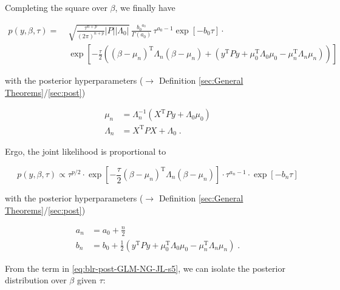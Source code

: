 \documentclass[a4paper,12pt,twoside]{book}
\begin{document}
Completing the square over $\beta$, we finally have

\begin{equation} \label{eq:blr-post-GLM-NG-JL-s4}
\begin{split}
p(y,\beta,\tau) = \; & \sqrt{\frac{\tau^{n+p}}{(2 \pi)^{n+p}} |P| |\Lambda_0|} \, \frac{ {b_0}^{a_0}}{\Gamma(a_0)} \, \tau^{a_0-1} \exp[-b_0 \tau] \cdot \\
& \exp\left[ -\frac{\tau}{2} \left( (\beta-\mu_n)^\mathrm{T} \Lambda_n (\beta-\mu_n) + (y^\mathrm{T} P y + \mu_0^\mathrm{T} \Lambda_0 \mu_0 - \mu_n^\mathrm{T} \Lambda_n \mu_n) \right) \right]
\end{split}
\end{equation}

with the posterior hyperparameters ($\rightarrow$ Definition \ref{sec:General Theorems}/\ref{sec:post})

\begin{equation} \label{eq:blr-post-GLM-NG-post-beta-par}
\begin{split}
\mu_n &= \Lambda_n^{-1} (X^\mathrm{T} P y + \Lambda_0 \mu_0) \\
\Lambda_n &= X^\mathrm{T} P X + \Lambda_0 \; .
\end{split}
\end{equation}

Ergo, the joint likelihood is proportional to

\begin{equation} \label{eq:blr-post-GLM-NG-JL-s5}
p(y,\beta,\tau) \propto \tau^{p/2} \cdot \exp\left[ -\frac{\tau}{2} (\beta-\mu_n)^\mathrm{T} \Lambda_n (\beta-\mu_n) \right] \cdot \tau^{a_n-1} \cdot \exp\left[ -b_n \tau \right]
\end{equation}

with the posterior hyperparameters ($\rightarrow$ Definition \ref{sec:General Theorems}/\ref{sec:post})

\begin{equation} \label{eq:blr-post-GLM-NG-post-tau-par}
\begin{split}
a_n &= a_0 + \frac{n}{2} \\
b_n &= b_0 + \frac{1}{2} (y^\mathrm{T} P y + \mu_0^\mathrm{T} \Lambda_0 \mu_0 - \mu_n^\mathrm{T} \Lambda_n \mu_n) \; .
\end{split}
\end{equation}

From the term in \eqref{eq:blr-post-GLM-NG-JL-s5}, we can isolate the posterior distribution over $\beta$ given $\tau$:
\end{document}
